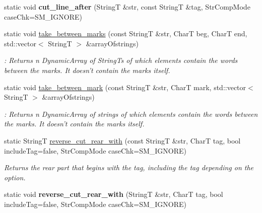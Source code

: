 \begin{CompactItemize}
\item 
\hypertarget{classAlgorithm_ad27aa1fdeee7b587caeb7ea1fd0efd6}{
static void \textbf{cut\_\-line\_\-after} (StringT \&str, const StringT \&tag, StrCompMode caseChk=SM\_\-IGNORE)}
\label{classAlgorithm_ad27aa1fdeee7b587caeb7ea1fd0efd6}

\item 
\hypertarget{classAlgorithm_608f3b14b1fc1f2da645f17ec11246f4}{
static void \hyperlink{classAlgorithm_608f3b14b1fc1f2da645f17ec11246f4}{take\_\-between\_\-marks} (const StringT \&str, CharT beg, CharT end, std::vector$<$ StringT $>$ \&arrayOfstrings)}
\label{classAlgorithm_608f3b14b1fc1f2da645f17ec11246f4}

\begin{CompactList}\small\item\em : Returns n DynamicArray of StringTs of which elements contain the words between the marks. It doesn't contain the marks itself. \item\end{CompactList}\item 
\hypertarget{classAlgorithm_e5fb413e10c74a15ad845d55033532ee}{
static void \hyperlink{classAlgorithm_e5fb413e10c74a15ad845d55033532ee}{take\_\-between\_\-mark} (const StringT \&str, CharT mark, std::vector$<$ StringT $>$ \&arrayOfstrings)}
\label{classAlgorithm_e5fb413e10c74a15ad845d55033532ee}

\begin{CompactList}\small\item\em : Returns n DynamicArray of strings of which elements contain the words between the marks. It doesn't contain the marks itself. \item\end{CompactList}\item 
\hypertarget{classAlgorithm_cb7b68dc4465cc781c42c92859807cab}{
static StringT \hyperlink{classAlgorithm_cb7b68dc4465cc781c42c92859807cab}{reverse\_\-cut\_\-rear\_\-with} (const StringT \&str, CharT tag, bool includeTag=false, StrCompMode caseChk=SM\_\-IGNORE)}
\label{classAlgorithm_cb7b68dc4465cc781c42c92859807cab}

\begin{CompactList}\small\item\em Returns the rear part that begins with the tag, including the tag depending on the option. \item\end{CompactList}\item 
\hypertarget{classAlgorithm_822b25f8be062758f30ae2a466c9ba9a}{
static void \textbf{reverse\_\-cut\_\-rear\_\-with} (StringT \&str, CharT tag, bool includeTag=false, StrCompMode caseChk=SM\_\-IGNORE)}
\label{classAlgorithm_822b25f8be062758f30ae2a466c9ba9a}


\end{CompactItemize}
